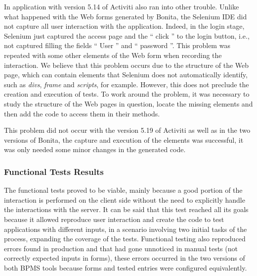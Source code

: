 \documentclass[runningheads,a4paper]{llncs}
\begin{document}
In application with version 5.14 of Activiti also ran into other trouble. Unlike what happened with the Web forms generated by Bonita, the Selenium IDE did not capture all user interaction with the application. Indeed, in the login stage, Selenium just captured the access page and the `` click '' to the login button, i.e., not captured filling the fields `` User '' and `` password ''. This problem was repeated with some other elements of the Web form when recording the interaction. We believe that this problem occurs due to the structure of the Web page, which can contain elements that Selenium does not automatically identify, such as \emph{divs}, \emph{frame} and \emph{scripts}, for example. However, this does not preclude the creation and execution of tests. To work around the problem, it was necessary to study the structure of the Web pages in question, locate the missing elements and then add the code to access them in their methods. 

This problem did not occur with the version 5.19 of Activiti as well as in the two versions of Bonita, the capture and execution of the elements was successful, it was only needed some minor changes in the generated code.

\subsubsection{Functional Tests Results} 
The functional tests proved to be viable, mainly because a good portion of the interaction is performed on the client side without the need to explicitly handle the interactions with the server. It can be said that this test reached all its goals because it allowed reproduce user interaction and create the code to test applications with different inputs, in a scenario involving two initial tasks of the process, expanding the coverage of the tests. Functional testing also reproduced errors found in production and that had gone unnoticed in manual tests (not correctly expected inputs in forms), these errors occurred in the two versions of both BPMS tools because forms and tested entries were configured equivalently.

\end{document}
